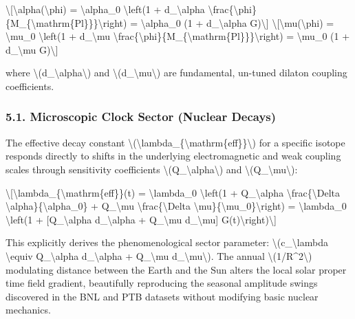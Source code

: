 \documentclass[
  10pt,
]{article}
\begin{document}
\textbackslash{[}\textbackslash alpha(\textbackslash phi) =
\textbackslash alpha\_0 \textbackslash left(1 + d\_\textbackslash alpha
\textbackslash frac\{\textbackslash phi\}\{M\_\{\textbackslash mathrm\{Pl\}\}\}\textbackslash right)
= \textbackslash alpha\_0 (1 + d\_\textbackslash alpha
G)\textbackslash{]}
\textbackslash{[}\textbackslash mu(\textbackslash phi) =
\textbackslash mu\_0 \textbackslash left(1 + d\_\textbackslash mu
\textbackslash frac\{\textbackslash phi\}\{M\_\{\textbackslash mathrm\{Pl\}\}\}\textbackslash right)
= \textbackslash mu\_0 (1 + d\_\textbackslash mu G)\textbackslash{]}

where \textbackslash(d\_\textbackslash alpha\textbackslash) and
\textbackslash(d\_\textbackslash mu\textbackslash) are fundamental,
un-tuned dilaton coupling coefficients.

\hypertarget{microscopic-clock-sector-nuclear-decays}{%
\subsubsection{5.1. Microscopic Clock Sector (Nuclear
Decays)}\label{microscopic-clock-sector-nuclear-decays}}

The effective decay constant
\textbackslash(\textbackslash lambda\_\{\textbackslash mathrm\{eff\}\}\textbackslash)
for a specific isotope responds directly to shifts in the underlying
electromagnetic and weak coupling scales through sensitivity
coefficients \textbackslash(Q\_\textbackslash alpha\textbackslash) and
\textbackslash(Q\_\textbackslash mu\textbackslash):

\textbackslash{[}\textbackslash lambda\_\{\textbackslash mathrm\{eff\}\}(t)
= \textbackslash lambda\_0 \textbackslash left(1 +
Q\_\textbackslash alpha \textbackslash frac\{\textbackslash Delta
\textbackslash alpha\}\{\textbackslash alpha\_0\} + Q\_\textbackslash mu
\textbackslash frac\{\textbackslash Delta
\textbackslash mu\}\{\textbackslash mu\_0\}\textbackslash right) =
\textbackslash lambda\_0 \textbackslash left(1 +
{[}Q\_\textbackslash alpha d\_\textbackslash alpha +
Q\_\textbackslash mu d\_\textbackslash mu{]}
G(t)\textbackslash right)\textbackslash{]}

This explicitly derives the phenomenological sector parameter:
\textbackslash(c\_\textbackslash lambda \textbackslash equiv
Q\_\textbackslash alpha d\_\textbackslash alpha + Q\_\textbackslash mu
d\_\textbackslash mu\textbackslash). The annual
\textbackslash(1/R\^{}2\textbackslash) modulating distance between the
Earth and the Sun alters the local solar proper time field gradient,
beautifully reproducing the seasonal amplitude swings discovered in the
BNL and PTB datasets without modifying basic nuclear mechanics.
\end{document}
